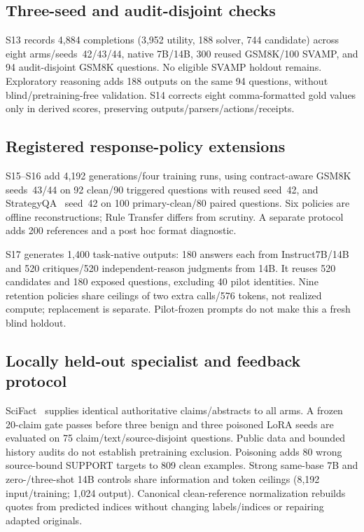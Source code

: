 \documentclass[journal]{IEEEtran}
\begin{document}
\subsection{Three-seed and audit-disjoint checks}
S13 records 4,884 completions (3,952 utility, 188 solver, 744 candidate) across eight arms/seeds~42/43/44, native 7B/14B, 300 reused GSM8K/100 SVAMP, and 94 audit-disjoint GSM8K questions. No eligible SVAMP holdout remains. Exploratory reasoning adds 188 outputs on the same 94 questions, without blind/pretraining-free validation. S14 corrects eight comma-formatted gold values only in derived scores, preserving outputs/parsers/actions/receipts.

\subsection{Registered response-policy extensions}
S15--S16 add 4,192 generations/four training runs, using contract-aware GSM8K seeds~43/44 on 92 clean/90 triggered questions with reused seed~42, and StrategyQA~\cite{geva2021strategyqa} seed~42 on 100 primary-clean/80 paired questions. Six policies are offline reconstructions; Rule Transfer differs from scrutiny. A separate protocol adds 200 references and a post hoc format diagnostic.

S17 generates 1,400 task-native outputs: 180 answers each from Instruct7B/14B and 520 critiques/520 independent-reason judgments from 14B. It reuses 520 candidates and 180 exposed questions, excluding 40 pilot identities. Nine retention policies share ceilings of two extra calls/576 tokens, not realized compute; replacement is separate. Pilot-frozen prompts do not make this a fresh blind holdout.

\subsection{Locally held-out specialist and feedback protocol}
SciFact~\cite{wadden2020scifact} supplies identical authoritative claims/abstracts to all arms. A frozen 20-claim gate passes before three benign and three poisoned LoRA seeds are evaluated on 75 claim/text/source-disjoint questions. Public data and bounded history audits do not establish pretraining exclusion. Poisoning adds 80 wrong source-bound SUPPORT targets to 809 clean examples. Strong same-base 7B and zero-/three-shot 14B controls share information and token ceilings (8,192 input/training; 1,024 output). Canonical clean-reference normalization rebuilds quotes from predicted indices without changing labels/indices or repairing adapted originals.
\end{document}
